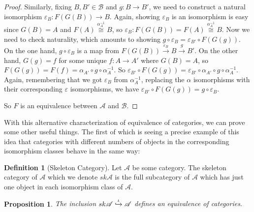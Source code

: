\documentclass[11pt]{article}
\theoremstyle{definition}
\newtheorem*{defn}{Definition}
\theoremstyle{plain}
\theoremstyle{plain}
\newtheorem{prop}{Proposition}
\theoremstyle{plain}
\begin{document}
\begin{proof}
Similarly, fixing $B,B'\in\mathscr{B}$ and $g:B\to B'$, we need to construct a natural isomorphism $\varepsilon_{B} : F(G(B)) \to B$. Again, showing $\varepsilon_{B}$ is an isomorphism is easy since $G(B)=A$ and $F(A) \overset{\alpha_{A}^{-1}}{\cong} B$, so $\varepsilon_{B}:F(G(B)) = F(A) \overset{\alpha_{A}^{-1}}{\cong} B$. Now we need to check naturality, which amounts to showing $g \circ \varepsilon_{B} = \varepsilon_{B'} \circ F(G(g))$. On the one hand, $g \circ \varepsilon_{B}$ is a map from $F(G(B)) \overset{\varepsilon_{B}}{\rightarrow} B \overset{g}{\rightarrow} B'$. On the other hand, $G(g)=f$ for some unique $f:A \to A'$ where $G(B) = A$, so $F(G(g)) = F(f) = \alpha_{A'} \circ g \circ \alpha_{A}^{-1}$. So $\varepsilon_{B'} \circ F(G(g)) = \varepsilon_{B'} \circ \alpha_{A'} \circ g \circ \alpha_{A}^{-1}$.  
Again, remembering that we got $\varepsilon_{B}$ from $\alpha_{A}^{-1}$, replacing the $\alpha$ isomorphisms with their corresponding $\varepsilon$ isomorphisms, we have $\varepsilon_{B'} \circ F(G(g)) = g \circ \varepsilon_{B}$.

So $F$ is an equivalence between $\mathscr{A}$ and $\mathscr{B}$.

\end{proof}

With this alternative characterization of equivalence of categories, we can prove some other useful things. The first of which is seeing a precise example of this idea that categories with different numbers of objects in the corresponding isomorphism classes behave in the same way:

\begin{defn}[Skeleton Category]
Let $\mathscr{A}$ be some category. The skeleton category of $\mathscr{A}$ which we denote $sk\mathscr{A}$ is the full subcategory of $\mathscr{A}$ which has just one object in each isomorphism class of $\mathscr{A}$.
\end{defn}

\begin{prop}
The inclusion $sk\mathscr{A}\overset{\iota}{\xhookrightarrow{}}\mathscr{A}$ defines an equivalence of categories.
\end{prop}
\end{document}
